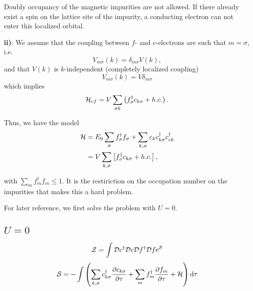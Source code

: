 Doubly occupancy of the magnetic impurities are not allowed. If there already exist a spin on the lattice site of the impurity, a conducting electron can not enter this localized orbital.

\textbf{ii)}: We assume that the coupling between $f$- and $c$-electrons are such that $m = \sigma$,  i.e. 
\begin{equation}
	V_{m\sigma}(k) =\delta_{m\sigma}V(k), 
\end{equation}
and that $V(k)$ is $k$-independent (completely localized coupling)
\begin{equation}
	V_{m\sigma}(k) = V\delta_{m\sigma}
\end{equation}
which implies
\begin{equation}
	\mathcal{H}_{cf} = V\sum_{\sigma k}\left(f_\sigma^\dagger c_{k\sigma} + h.c.\right).
\end{equation}

Thus, we have the model 
\begin{align}
	\begin{split}
	\mathcal{H} &= E_0\sum_{\sigma}f_\sigma^\dagger f_\sigma + \sum_{k,\sigma}\varepsilon_k c_{k\sigma}^\dagger c_{ck}^\dagger \\
	&= V\sum_{k,\sigma}\left[f_{\sigma}^\dagger c_{k\sigma} + h.c. \right],
	\end{split}
\end{align}

with \(\sum_mf_m^\dagger f_m \leq 1 \). It is the restiriction on the occupation number on the impurities that makes this a hard problem.

For later reference, we first solve the problem with $U = 0$.
\subsection{$U = 0$}

\begin{equation}
\mathcal{Z} = \int \mathcal{D} c^\dagger \mathcal{D} c\mathcal{D} f^\dagger \mathcal{D} f\mathrm{e}^{\mathcal{S}}
\end{equation}
\begin{equation}
\mathcal{S} = -\int\left(\sum_{k,\sigma}c_{k\sigma}^\dagger\pdv{c_{k\sigma}}{\tau} + \sum_mf_m^\dagger \pdv{f_m}{\tau} + \mathcal{H} \right)\dd{\tau}
\end{equation}

